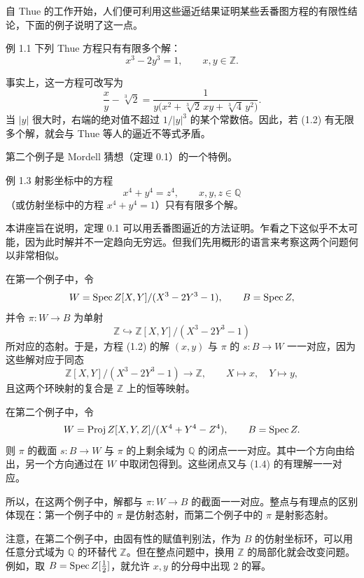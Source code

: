自 Thue 的工作开始，人们便可利用这些逼近结果证明某些丢番图方程的有限性结论，下面的例子说明了这一点。
\begin{statement}{例 1.1}
下列 Thue 方程只有有限多个解：
\begin{equation*}
x^3-2y^3=1,\qquad x,y\in\mathbb Z.\tag{1.2}
\end{equation*}
\end{statement}
事实上，这一方程可改写为
\[
\frac xy-\sqrt[3]2=
\frac1{y\bigl(x^2+\sqrt[3]2\,xy+\sqrt[3]4\,y^2\bigr)}.
\]
当 $|y|$ 很大时，右端的绝对值不超过 $1/|y|^3$ 的某个常数倍。因此，若 (1.2) 有无限多个解，就会与 Thue 等人的逼近不等式矛盾。

第二个例子是 Mordell 猜想（定理 0.1）的一个特例。
\begin{statement}{例 1.3}
射影坐标中的方程
\begin{equation*}
x^4+y^4=z^4,\qquad x,y,z\in\mathbb Q\tag{1.4}
\end{equation*}
（或仿射坐标中的方程 $x^4+y^4=1$）只有有限多个解。
\end{statement}
本讲座旨在说明，定理 0.1 可以用丢番图逼近的方法证明。乍看之下这似乎不太可能，因为此时解并不一定趋向无穷远。但我们先用概形的语言来考察这两个问题何以非常相似。

在第一个例子中，令
\[
W=\operatorname{Spec}Z[X,Y]/(X^3-2Y^3-1),\qquad B=\operatorname{Spec}Z,
\]
并令 $\pi:W\to B$ 为单射
\[
\mathbb Z\hookrightarrow\mathbb Z[X,Y]/(X^3-2Y^3-1)
\]
所对应的态射。于是，方程 (1.2) 的解 $(x,y)$ 与 $\pi$ 的 $s:B\to W$ 一一对应，因为这些解对应于同态
\[
\mathbb Z[X,Y]/(X^3-2Y^3-1)\longrightarrow\mathbb Z,
\qquad X\longmapsto x,\quad Y\longmapsto y,
\]
且这两个环映射的复合是 $\mathbb Z$ 上的恒等映射。

在第二个例子中，令
\[
W=\operatorname{Proj}Z[X,Y,Z]/(X^4+Y^4-Z^4),\qquad B=\operatorname{Spec}Z.
\]
则 $\pi$ 的截面 $s:B\to W$ 与 $\pi$ 的上剩余域为 $\mathbb Q$ 的闭点一一对应。其中一个方向由给出，另一个方向通过在 $W$ 中取闭包得到。这些闭点又与 (1.4) 的有理解一一对应。

所以，在这两个例子中，解都与 $\pi:W\to B$ 的截面一一对应。整点与有理点的区别体现在：第一个例子中的 $\pi$ 是仿射态射，而第二个例子中的 $\pi$ 是射影态射。

注意，在第二个例子中，由固有性的赋值判别法，作为 $B$ 的仿射坐标环，可以用任意分式域为 $\mathbb Q$ 的环替代 $\mathbb Z$。但在整点问题中，换用 $\mathbb Z$ 的局部化就会改变问题。例如，取 $B=\operatorname{Spec}Z[\tfrac12]$，就允许 $x,y$ 的分母中出现 $2$ 的幂。

